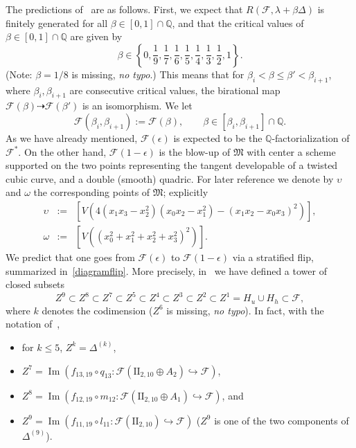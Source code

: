 \documentclass[11pt]{amsart}
\numberwithin{equation}{section}
\theoremstyle{plain}
\theoremstyle{remark}
\theoremstyle{definition}
\newcommand{\cF}{\mathscr{F}}
\newcommand{\im}{\operatorname{Im}}
\newcommand{\II}{\textrm{II}}
\newcommand{\dra}{\dashrightarrow}
\newcommand{\gM}{\mathfrak{M}}
\newcommand{\hra}{\hookrightarrow}
\newcommand{\QQ}{{\mathbb Q}}
\begin{document}
%
The predictions of~\cite{log1} are as follows. First, we expect that $R(\cF,\lambda+\beta \Delta)$ is finitely generated for all $\beta\in[0,1]\cap\QQ$, and that the critical values of $\beta\in[0,1]\cap\QQ$ are given by
%
\begin{equation}
\beta\in\left\{0,\frac{1}{9},\frac{1}{7},\frac{1}{6},\frac{1}{5},\frac{1}{4},\frac{1}{3},\frac{1}{2},1\right\}.
\end{equation}
%
(Note: $\beta=1/8$ is missing, \emph{no typo}.) This means that for $\beta_i<\beta\le \beta'<\beta_{i+1}$, where  $\beta_i,\beta_{i+1}$ are consecutive critical values, the birational map $\cF(\beta)\dra\cF(\beta')$ is an isomorphism. We let 
\begin{equation}\label{intmodel}
%
\cF(\beta_i,\beta_{i+1}):=\cF(\beta),\qquad \beta\in[\beta_i,\beta_{i+1}]\cap\QQ.
%
\end{equation}
As we have already mentioned, 
$\cF(\epsilon)$ is expected to be the $\QQ$-factorialization of $\cF^{*}$. On the other hand, $\cF(1-\epsilon)$ is the blow-up of $\gM$ 
with center a scheme supported on  the two points representing the tangent developable of a twisted cubic curve, and a double (smooth) quadric. For later reference  
 we denote by $\upsilon$ and $\omega$ the corresponding points of $\gM$; explicitly
 \begin{eqnarray}
%
\upsilon & := & [V(4(x_1 x_3-x_2^2)(x_0 x_2-x_1^2)-(x_1 x_2-x_0 x_3)^2)], \label{tangsvil} \\
%
\omega & := & [V((x_0^2+x_1^2+x_2^2+x_3^2)^2)]. \label{quadop}
%
\end{eqnarray}
% 
We predict that one goes from $\cF(\epsilon)$ to $\cF(1-\epsilon)$ via a stratified flip, summarized in~\eqref{diagramflip}. More precisely, in~\cite{log1} we have defined a tower of closed subsets
% 
\begin{equation}\label{zetaquart}
%
Z^{9}\subset Z^{8} \subset Z^{7}\subset Z^{5}\subset Z^{4}\subset Z^{3}\subset Z^{2}\subset Z^{1}=H_u\cup H_h\subset \cF,
%
\end{equation}
%
where  $k$ denotes the codimension ($Z^6$ is missing, \emph{no typo}). In fact, with the notation of~\cite{log1}, 
%
\begin{itemize}
%
\item for $k\le 5$, $Z^k=\Delta^{(k)}$,
%
\item $Z^7=\im(f_{13,19}\circ q_{13}\colon \cF(\II_{2,10}\oplus A_2)\hra\cF)$, 
%
\item $Z^8=\im(f_{12,19}\circ m_{12}\colon \cF(\II_{2,10}\oplus A_1)\hra\cF)$, and
%
\item $Z^9=\im(f_{11,19}\circ l_{11}\colon \cF(\II_{2,10})\hra\cF)$ ($Z^9$ is one of the two components of $\Delta^{(9)}$). 
% 
\end{itemize}
\end{document}
